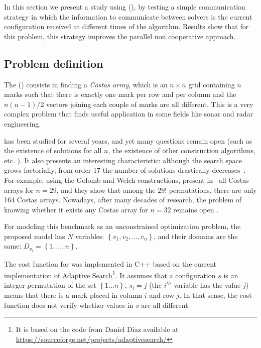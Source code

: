 In this section we present a study using \carrp{} (\CARRP), by testing a simple communication strategy in which the information to communicate between solvers is the current configuration received at different times of the algorithm. Results show that for this problem, this strategy improves the parallel non cooperative approach.

\subsection{Problem definition}

The \carrp{} (\CARRP) consists in finding a \textit{Costas array}, which is an $n\times n$ grid containing $n$ marks such that there is exactly one mark per row and per column and the ${n(n-1)/2}$ vectors joining each couple of marks are all different. This is a very complex problem that finds useful application in some fields like sonar and radar engineering.

\CARRP{} has been studied for several years, and yet many questions remain open (such as the existence of solutions for all $n$, the existence of other construction algorithms, etc. \cite{Rickard}). It also presents an interesting characteristic: although the search space grows factorially, from order 17 the number of solutions drastically decreases~\cite{Drakakis2006}. For example, using the Golomb \cite{Golomb1984a} and Welch \cite{Golomb1984} constructions,  present in~\cite{Drakakis2011} all Costas arrays for $n = 29$, and they show that among the $29!$ permutations, there are only 164 Costas arrays. Nowadays, after many decades of research, the problem of knowing whether it  exists any Costas array for $n = 32$ remains open \cite{Caniou14}.

For modeling this benchmark as an unconstrained optimization problem, the proposed model has $N$ variables: $\left\{v_1, v_2, \dots, v_n\right\}$, and their domains are the same: ${D_{v_i}=\left\{1, \dots, n\right\}}$.

The cost function for \CARRP{} was implemented in C++ based on the current implementation of Adaptive Search\footnote{It is based on the code from Daniel D\'{i}az available at \href{https://sourceforge.net/projects/adaptivesearch/}{https://sourceforge.net/projects/adaptivesearch/}}. It assumes that a configuration $s$ is an integer permutation of the set $\left\{1...n\right\}$, \ie $s_i = j$ (the $i^{th}$ variable has the value $j$) means that there is a mark placed in column $i$ and row $j$. In that sense, the cost function does not verify whether values in $s$ are all different.

